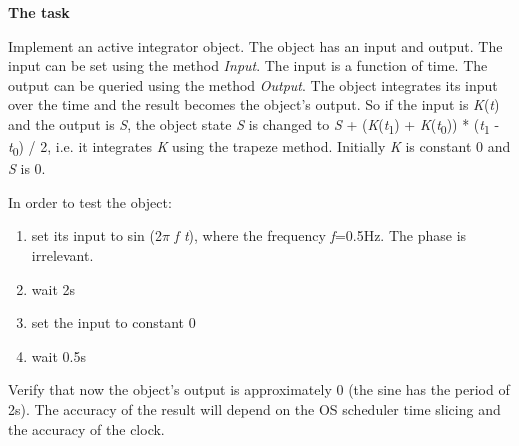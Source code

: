 
\textbf{The task}

Implement an active integrator object. The object has an input and
output. The input can be set using the method \emph{Input}. The input is
a function of time. The output can be queried using the method
\emph{Output}. The object integrates its input over the time and the
result becomes the object's output. So if the input is
\emph{K}(\emph{t}) and the output is \emph{S}, the object state \emph{S}
is changed to \emph{S} + (\emph{K}(\emph{t}\textsubscript{1}) +
\emph{K}(\emph{t}\textsubscript{0})) * (\emph{t}\textsubscript{1} -
\emph{t}\textsubscript{0}) / 2, i.e. it integrates \emph{K} using the
trapeze method. Initially \emph{K} is constant 0 and \emph{S} is 0.

In order to test the object:

\begin{enumerate}
\item
  set its input to sin (2$\pi$ \emph{f t}), where the frequency
  \emph{f}=0.5Hz. The phase is irrelevant.
\item
  wait 2s
\item
  set the input to constant 0
\item
  wait 0.5s
\end{enumerate}

Verify that now the object's output is approximately 0 (the sine has
the period of 2s). The accuracy of the result will depend on the OS
scheduler time slicing and the accuracy of the clock.



